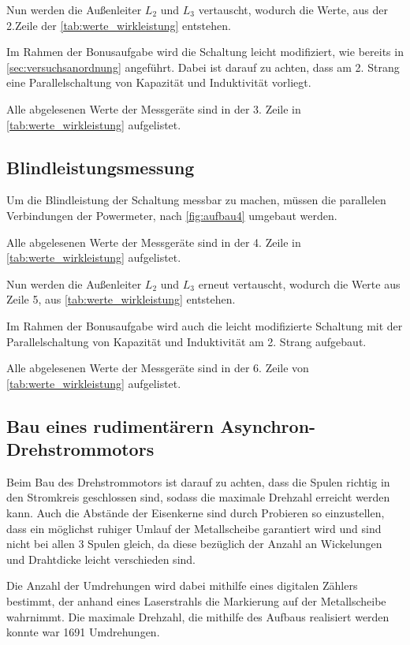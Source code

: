 \documentclass[12pt,english,ngerman]{scrartcl}
\begin{document}
Nun werden die Außenleiter $L_2$ und $L_3$ vertauscht, wodurch die Werte, aus
der 2.Zeile der \autoref{tab:werte_wirkleistung} entstehen.

Im Rahmen der Bonusaufgabe wird die Schaltung leicht modifiziert, wie bereits
in \autoref{sec:versuchsanordnung} angeführt. Dabei ist darauf zu achten, dass
am 2. Strang eine Parallelschaltung von Kapazität und Induktivität vorliegt.

Alle abgelesenen Werte der Messgeräte sind in der 3. Zeile in
\autoref{tab:werte_wirkleistung} aufgelistet.

\subsection{Blindleistungsmessung}

Um die Blindleistung der Schaltung messbar zu machen, müssen die parallelen
Verbindungen der Powermeter, nach \autoref{fig:aufbau4} umgebaut werden.

Alle abgelesenen Werte der Messgeräte sind in der 4. Zeile in
\autoref{tab:werte_wirkleistung} aufgelistet.

Nun werden die Außenleiter $L_2$ und $L_3$ erneut vertauscht, wodurch die Werte
aus Zeile 5, aus \autoref{tab:werte_wirkleistung} entstehen.

Im Rahmen der Bonusaufgabe wird auch die leicht modifizierte Schaltung mit der
Parallelschaltung von Kapazität und Induktivität am 2. Strang aufgebaut.

Alle abgelesenen Werte der Messgeräte sind in der 6. Zeile von
\autoref{tab:werte_wirkleistung} aufgelistet.

\subsection{Bau eines rudimentärern Asynchron-Drehstrommotors}

Beim Bau des Drehstrommotors ist darauf zu achten, dass die Spulen richtig in
den Stromkreis geschlossen sind, sodass die maximale Drehzahl erreicht werden
kann. Auch die Abstände der Eisenkerne sind durch Probieren so einzustellen,
dass ein möglichst ruhiger Umlauf der Metallscheibe garantiert wird und sind
nicht bei allen 3 Spulen gleich, da diese bezüglich der Anzahl an Wickelungen
und Drahtdicke leicht verschieden sind.

Die Anzahl der Umdrehungen wird dabei mithilfe eines digitalen Zählers
bestimmt, der anhand eines Laserstrahls die Markierung auf der Metallscheibe
wahrnimmt. Die maximale Drehzahl, die mithilfe des Aufbaus realisiert werden
konnte war 1691 Umdrehungen.
\end{document}
